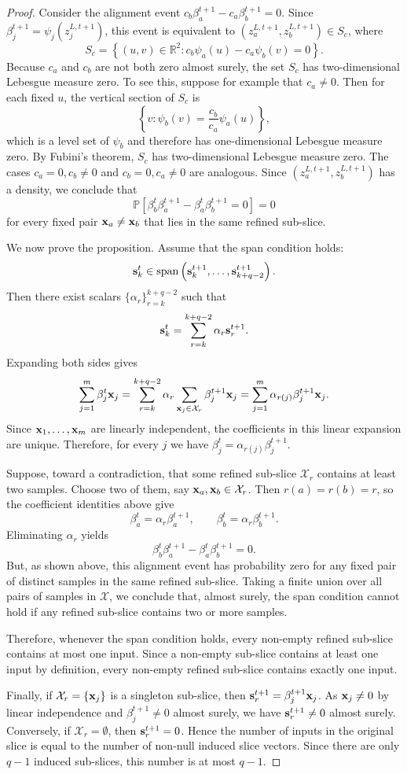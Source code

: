 \begin{proof}
Consider the  alignment event $c_b\beta_a^{t+1}-c_a\beta_b^{t+1}=0$. Since $\beta_j^{t+1}=\psi_j(z_j^{L,t+1})$, this event is equivalent to $(z_a^{L,t+1},z_b^{L,t+1})\in S_c$, where
\[
S_c
=
\left\{
(u,v)\in\mathbb R^2:
c_b\psi_a(u)-c_a\psi_b(v)=0
\right\}.
\]
Because $c_a$ and $c_b$ are not both zero almost surely, the set $S_c$ has
two-dimensional Lebesgue measure zero. To see this, suppose for example that
$c_a\neq 0$. Then for each fixed $u$, the vertical section of $S_c$ is
\[
\left\{
v:
\psi_b(v)=\frac{c_b}{c_a}\psi_a(u)
\right\},
\]
which is a level set of $\psi_b$ and therefore has one-dimensional Lebesgue
measure zero. By Fubini's theorem, $S_c$ has two-dimensional Lebesgue measure
zero. The cases $c_a=0,c_b\neq0$ and $c_b=0,c_a\neq0$ are analogous.
Since $(z_a^{L,t+1},z_b^{L,t+1})$ has a density, we conclude that
\[
\mathbb P\left[
\beta_b^t\beta_a^{t+1}
-
\beta_a^t\beta_b^{t+1}
=0
\right]
=0
\]
for every fixed pair ${\mathbf{x}}_a\neq {\mathbf{x}}_b$ that lies in the same refined sub-slice.

We now prove the proposition. Assume that the span condition holds:
\[
\mathbf{s}_k^t
\in
\operatorname{span}\left(
\mathbf{s}_k^{t+1},\ldots,\mathbf{s}_{k+q-2}^{t+1}
\right).
\]
Then there exist scalars $\{\alpha_r\}_{r=k}^{k+q-2}$ such that
\[
\mathbf{s}_k^t
=
\sum_{r=k}^{k+q-2}\alpha_r\mathbf{s}_r^{t+1}.
\]
Expanding both sides gives
\[
\sum_{j=1}^m \beta_j^t{\mathbf{x}}_j
=
\sum_{r=k}^{k+q-2}\alpha_r
\sum_{{\mathbf{x}}_j\in\mathcal X_r}\beta_j^{t+1}{\mathbf{x}}_j
=
\sum_{j=1}^m
\alpha_{r(j)}\beta_j^{t+1}{\mathbf{x}}_j.
\]
Since ${\mathbf{x}}_1,\ldots,{\mathbf{x}}_m$ are linearly independent, the coefficients in this
linear expansion are unique. Therefore, for every $j$ we have $\beta_j^t = \alpha_{r(j)}\beta_j^{t+1}$.

Suppose, toward a contradiction, that some refined sub-slice $\mathcal X_r$
contains at least two samples. Choose two of them, say ${\mathbf{x}}_a,{\mathbf{x}}_b\in\mathcal X_r$.
Then $r(a)=r(b)=r$, so the coefficient identities above give
\[
\beta_a^t=\alpha_r\beta_a^{t+1},
\qquad
\beta_b^t=\alpha_r\beta_b^{t+1}.
\]
Eliminating $\alpha_r$ yields
\[
\beta_b^t\beta_a^{t+1}
-
\beta_a^t\beta_b^{t+1}
=0.
\]
But, as shown above, this alignment event has probability zero for any fixed
pair of distinct samples in the same refined sub-slice. Taking a finite union
over all pairs of samples in $\mathcal X$, we conclude that, almost surely,
the span condition cannot hold if any refined sub-slice contains two or more
samples.

Therefore, whenever the span condition holds, every non-empty refined sub-slice
contains at most one input. Since a non-empty sub-slice contains at least one
input by definition, every non-empty refined sub-slice contains exactly one
input.

Finally, if $\mathcal X_r=\{{\mathbf{x}}_j\}$ is a singleton sub-slice, then $\mathbf{s}_r^{t+1} = \beta_j^{t+1}{\mathbf{x}}_j$.
As ${\mathbf{x}}_j\neq 0$ by linear independence and
$\beta_j^{t+1}\neq 0$ almost surely, we have
$\mathbf{s}_r^{t+1}\neq 0$ almost surely. Conversely, if $\mathcal X_r=\emptyset$,
then $\mathbf{s}_r^{t+1}=0$. Hence the number of inputs in the original slice is
equal to the number of non-null induced slice vectors. Since there are only
$q-1$ induced sub-slices, this number is at most $q-1$.
\end{proof}

